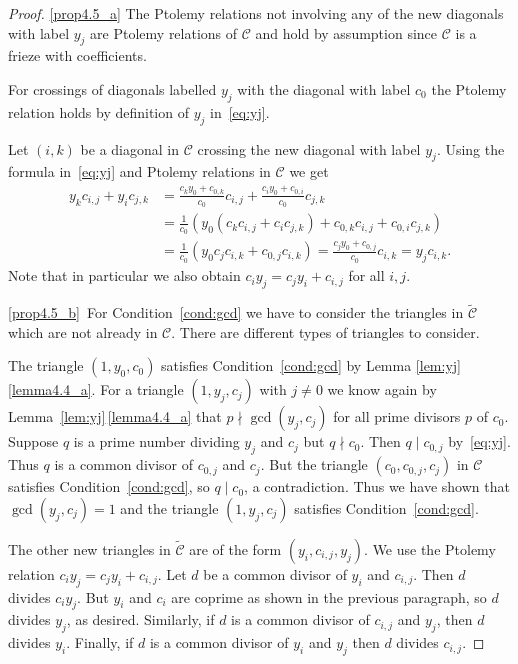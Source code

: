 \documentclass[10pt]{amsart}
\numberwithin{equation}{section}
\theoremstyle{definition}
\theoremstyle{remark}
\begin{document}
\begin{proof}
\ref{prop4.5_a} The Ptolemy relations not involving any of the new diagonals with
label $y_j$ are Ptolemy relations of $\mathcal{C}$ and hold by assumption 
since $\mathcal{C}$ is a frieze with coefficients. 

For crossings of diagonals labelled $y_j$ with the diagonal with label $c_0$
the Ptolemy relation holds by definition of $y_j$ in~\eqref{eq:yj}. 

Let $(i,k)$ be a diagonal in $\mathcal{C}$ crossing the new diagonal with label 
$y_j$. Using the formula in~\eqref{eq:yj} and Ptolemy relations in $\mathcal{C}$
we get
\begin{align*}
y_kc_{i,j} + y_i c_{j,k} & =  \frac{c_ky_0+c_{0,k}}{c_0} c_{i,j}
+ \frac{c_iy_0+c_{0,i}}{c_0} c_{j,k} \\
& =  \frac{1}{c_0} ( y_0 (c_kc_{i,j} + c_ic_{j,k}) + 
c_{0,k} c_{i,j} + c_{0,i} c_{j,k}) \\
& =  \frac{1}{c_0} ( y_0 c_jc_{i,k} + c_{0,j}c_{i,k}) 
 = \frac{c_j y_0+c_{0,j}}{c_0} c_{i,k} = y_j c_{i,k}. 
\end{align*}
Note that in particular we also obtain $c_i y_j = c_j y_i + c_{i,j}$ for all $i,j$.

\ref{prop4.5_b}~For Condition~\eqref{cond:gcd} we have to consider the triangles in
$\widetilde{\mathcal{C}}$ which are not already in $\mathcal{C}$. 
There are different types of triangles to consider. 

The triangle $(1,y_0,c_0)$ satisfies Condition~\eqref{cond:gcd} by Lemma 
\ref{lem:yj}\,\ref{lemma4.4_a}. For a triangle $(1,y_j,c_j)$ with $j\neq 0$ we know again
by Lemma~\ref{lem:yj}\,\ref{lemma4.4_a} that $p\nmid \gcd(y_j,c_j)$ for all prime divisors
$p$ of $c_0$. Suppose $q$ is a prime number dividing $y_j$ and $c_j$ but
$q\nmid c_0$. Then $q\mid c_{0,j}$ by~\eqref{eq:yj}. Thus $q$ is a common divisor
of $c_{0,j}$ and $c_j$. But the triangle $(c_0,c_{0,j},c_j)$ in $\mathcal{C}$
satisfies Condition~\eqref{cond:gcd}, so $q\mid c_0$, a contradiction. Thus 
we have shown that $\gcd(y_j,c_j)=1$ and the triangle $(1,y_j,c_j)$ satisfies
Condition~\eqref{cond:gcd}.

The other new triangles in $\widetilde{\mathcal{C}}$ are of the form
$(y_i,c_{i,j},y_j)$. We use the Ptolemy relation $c_i y_j = c_j y_i + c_{i,j}$.
Let $d$ be a common divisor of $y_i$ and $c_{i,j}$. Then $d$ divides $c_iy_j$.
But $y_i$ and $c_i$ are coprime as shown in the previous paragraph, so $d$ divides $y_j$, as desired. Similarly, if $d$ is a common divisor of $c_{i,j}$ and $y_j$, then $d$ divides $y_i$. Finally, if $d$ is a common divisor 
of $y_i$ and $y_j$ then $d$ divides $c_{i,j}$. 


\end{proof}
\end{document}
